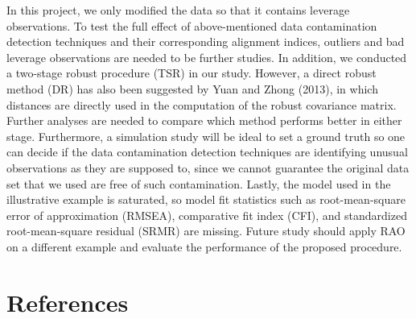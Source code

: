 \documentclass[
  man]{apa7}
\begin{document}
In this project, we only modified the data so that it contains leverage observations. To test the full effect of above-mentioned data contamination detection techniques and their corresponding alignment indices, outliers and bad leverage observations are needed to be further studies. In addition, we conducted a two-stage robust procedure (TSR) in our study. However, a direct robust method (DR) has also been suggested by Yuan and Zhong (2013), in which distances are directly used in the computation of the robust covariance matrix. Further analyses are needed to compare which method performs better in either stage. Furthermore, a simulation study will be ideal to set a ground truth so one can decide if the data contamination detection techniques are identifying unusual observations as they are supposed to, since we cannot guarantee the original data set that we used are free of such contamination. Lastly, the model used in the illustrative example is saturated, so model fit statistics such as root-mean-square error of approximation (RMSEA), comparative fit index (CFI), and standardized root-mean-square residual (SRMR) are missing. Future study should apply RAO on a different example and evaluate the performance of the proposed procedure.

\newpage

\section{References}\label{references}
\end{document}
